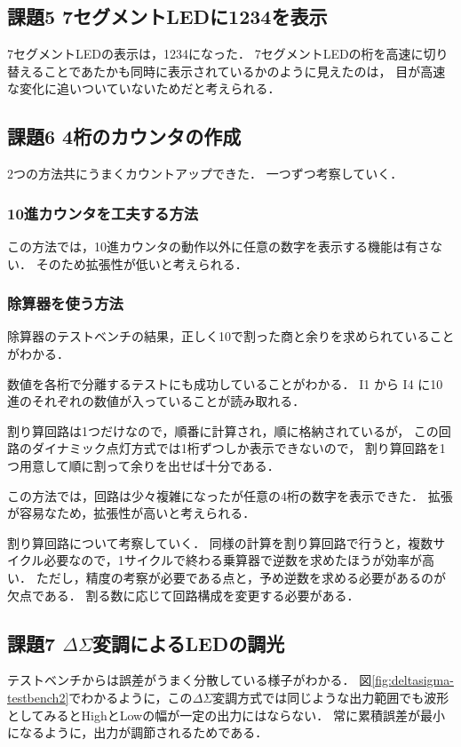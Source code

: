 \subsection{課題5 7セグメントLEDに1234を表示}
7セグメントLEDの表示は，1234になった．
7セグメントLEDの桁を高速に切り替えることであたかも同時に表示されているかのように見えたのは，
目が高速な変化に追いついていないためだと考えられる．

\subsection{課題6 4桁のカウンタの作成}
2つの方法共にうまくカウントアップできた．
一つずつ考察していく．

\subsubsection{10進カウンタを工夫する方法}
この方法では，10進カウンタの動作以外に任意の数字を表示する機能は有さない．
そのため拡張性が低いと考えられる．

\subsubsection{除算器を使う方法}
除算器のテストベンチの結果，正しく10で割った商と余りを求められていることがわかる．

数値を各桁で分離するテストにも成功していることがわかる．
I1 から I4 に10進のそれぞれの数値が入っていることが読み取れる．

割り算回路は1つだけなので，順番に計算され，順に格納されているが，
この回路のダイナミック点灯方式では1桁ずつしか表示できないので，
割り算回路を1つ用意して順に割って余りを出せば十分である．

この方法では，回路は少々複雑になったが任意の4桁の数字を表示できた．
拡張が容易なため，拡張性が高いと考えられる．

割り算回路について考察していく． 
同様の計算を割り算回路で行うと，複数サイクル必要なので，1サイクルで終わる乗算器で逆数を求めたほうが効率が高い．
ただし，精度の考察が必要である点と，予め逆数を求める必要があるのが欠点である．
割る数に応じて回路構成を変更する必要がある．

\subsection{課題7 $\Delta\Sigma$変調によるLEDの調光}
テストベンチからは誤差がうまく分散している様子がわかる．
図\ref{fig:deltasigma-testbench2}でわかるように，この$\Delta\Sigma$変調方式では同じような出力範囲でも波形としてみるとHighとLowの幅が一定の出力にはならない．
常に累積誤差が最小になるように，出力が調節されるためである．


